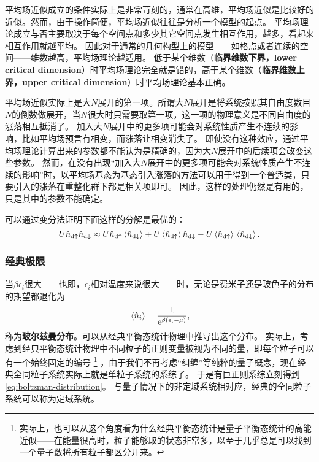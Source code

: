 \documentclass[hyperref, UTF8, a4paper]{ctexart}
\newcommand*{\ee}{\mathrm{e}}
\begin{document}
平均场近似成立的条件实际上是非常苛刻的，通常在高维，平均场近似是比较好的近似。然而，由于操作简便，平均场近似往往是分析一个模型的起点。
平均场理论成立与否主要取决于每个空间点和多少其它空间点发生相互作用，越多，看起来相互作用就越平均。
因此对于通常的几何构型上的模型——如格点或者连续的空间——维数越高，平均场理论越适用。
低于某个维数（\textbf{临界维数下界，lower critical dimension}）时平均场理论完全就是错的，高于某个维数（\textbf{临界维数上界，upper critical dimension}）时平均场理论基本正确。

平均场近似实际上是大$N$展开的第一项。所谓大$N$展开是将系统按照其自由度数目$N$的倒数做展开，当$N$很大时只需要取第一项，这一项的物理意义是不同自由度的涨落相互抵消了。
加入大$N$展开中的更多项可能会对系统性质产生不连续的影响，比如平均场预言有相变，而涨落让相变消失了。
即使没有这种效应，通过平均场理论计算出来的参数都不能认为是精确的，因为大$N$展开中的后续项会改变这些参数。
然而，在没有出现“加入大$N$展开中的更多项可能会对系统性质产生不连续的影响”时，以平均场基态为基态引入涨落的方法可以用于得到一个普适类，只要引入的涨落在重整化群下都是相关项即可。
因此，这样的处理仍然是有用的，只是其中的参数不能确定。

可以通过变分法证明下面这样的分解是最优的：
\begin{equation}
    U \hat{n}_{\text{d} \uparrow} \hat{n}_{\text{d} \downarrow} \approx U \hat{n}_{\text{d} \uparrow} \expval*{\hat{n}_{\text{d} \downarrow}} + U \expval*{\hat{n}_{\text{d} \uparrow}} \hat{n}_{\text{d} \downarrow} - U \expval*{\hat{n}_{\text{d} \uparrow}} \expval*{\hat{n}_{\text{d} \downarrow}}.
\end{equation}

\subsubsection{经典极限}

当$\beta \epsilon_i$很大——也即，$\epsilon_i$相对温度来说很大——时，无论是费米子还是玻色子的分布的期望都退化为
\begin{equation}
    \expval*{\hat{n}_i} = \frac{1}{\ee^{\beta (\epsilon_i - \mu)}},
    \label{eq:boltzman-distribution}
\end{equation}
称为\textbf{玻尔兹曼分布}。可以从经典平衡态统计物理中推导出这个分布。
实际上，考虑到经典平衡态统计物理中不同粒子的正则变量被视为不同的量，即每个粒子可以有一个始终固定的编号%
\footnote{实际上，也可以从这个角度看为什么经典平衡态统计是量子平衡态统计的高能近似——在能量很高时，粒子能够取的状态非常多，以至于几乎总是可以找到一个量子数将所有粒子都区分开来。}%
，由于我们不再考虑“纠缠”等纯粹的量子概念，现在经典全同粒子系统实际上就是单粒子系统的系综了。
于是有巨正则系综立刻得到\eqref{eq:boltzman-distribution}。
与量子情况下的非定域系统相对应，经典的全同粒子系统可以称为定域系统。
\end{document}
